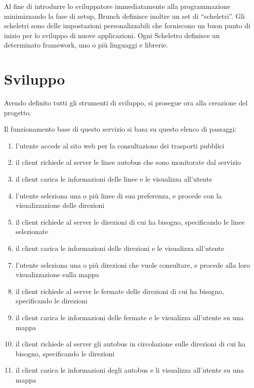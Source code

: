 Al fine di introdurre lo sviluppatore immediatamente alla programmazione minimizzando la fase di setup, Brunch definisce inoltre un set di ``scheletri''. Gli scheletri sono delle impostazioni personalizzabili che forniscono un buon punto di inizio per lo sviluppo di nuove applicazioni. Ogni Scheletro definisce un determinato framework, uno o più linguaggi e librerie.
\newpage

\section{Sviluppo} %
\label{sec:sviluppo}
Avendo definito tutti gli strumenti di sviluppo, si prosegue ora alla creazione del progetto.

Il funzionamento base di questo servizio si basa su questo elenco di passaggi:

\begin{enumerate}
  \item l'utente accede al sito web per la consultazione dei trasporti pubblici
  \item il client richiede al server le linee autobus che sono monitorate dal servizio
  \item il client carica le informazioni delle linee e le visualizza all'utente
  \item l'utente seleziona una o più linee di sua preferenza, e procede con la visualizzazione delle direzioni
  \item il client richiede al server le direzioni di cui ha bisogno, specificando le linee selezionate
  \item il client carica le informazioni delle direzioni e le visualizza all'utente
  \item l'utente seleziona una o più direzioni che vuole consultare, e procede alla loro visualizzazione sulla mappa
  \item il client richiede al server le fermate delle direzioni di cui ha bisogno, specificando le direzioni
  \item il client carica le informazioni delle fermate e le visualizza all'utente su una mappa
  \item il client richiede al server gli autobus in circolazione sulle direzioni di cui ha bisogno, specificando le direzioni
  \item il client carica le informazioni degli autobus e li visualizza all'utente su una mappa
\end{enumerate}
\newpage

